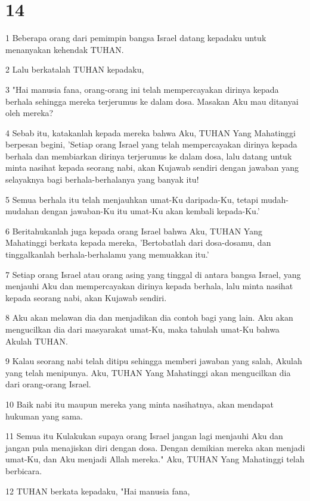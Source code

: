 \chapter{14}

\par 1 Beberapa orang dari pemimpin bangsa Israel datang kepadaku untuk menanyakan kehendak TUHAN.
\par 2 Lalu berkatalah TUHAN kepadaku,
\par 3 "Hai manusia fana, orang-orang ini telah mempercayakan dirinya kepada berhala sehingga mereka terjerumus ke dalam dosa. Masakan Aku mau ditanyai oleh mereka?
\par 4 Sebab itu, katakanlah kepada mereka bahwa Aku, TUHAN Yang Mahatinggi berpesan begini, 'Setiap orang Israel yang telah mempercayakan dirinya kepada berhala dan membiarkan dirinya terjerumus ke dalam dosa, lalu datang untuk minta nasihat kepada seorang nabi, akan Kujawab sendiri dengan jawaban yang selayaknya bagi berhala-berhalanya yang banyak itu!
\par 5 Semua berhala itu telah menjauhkan umat-Ku daripada-Ku, tetapi mudah-mudahan dengan jawaban-Ku itu umat-Ku akan kembali kepada-Ku.'
\par 6 Beritahukanlah juga kepada orang Israel bahwa Aku, TUHAN Yang Mahatinggi berkata kepada mereka, 'Bertobatlah dari dosa-dosamu, dan tinggalkanlah berhala-berhalamu yang memuakkan itu.'
\par 7 Setiap orang Israel atau orang asing yang tinggal di antara bangsa Israel, yang menjauhi Aku dan mempercayakan dirinya kepada berhala, lalu minta nasihat kepada seorang nabi, akan Kujawab sendiri.
\par 8 Aku akan melawan dia dan menjadikan dia contoh bagi yang lain. Aku akan mengucilkan dia dari masyarakat umat-Ku, maka tahulah umat-Ku bahwa Akulah TUHAN.
\par 9 Kalau seorang nabi telah ditipu sehingga memberi jawaban yang salah, Akulah yang telah menipunya. Aku, TUHAN Yang Mahatinggi akan mengucilkan dia dari orang-orang Israel.
\par 10 Baik nabi itu maupun mereka yang minta nasihatnya, akan mendapat hukuman yang sama.
\par 11 Semua itu Kulakukan supaya orang Israel jangan lagi menjauhi Aku dan jangan pula menajiskan diri dengan dosa. Dengan demikian mereka akan menjadi umat-Ku, dan Aku menjadi Allah mereka." Aku, TUHAN Yang Mahatinggi telah berbicara.
\par 12 TUHAN berkata kepadaku, "Hai manusia fana,
